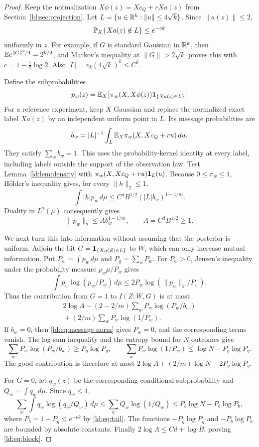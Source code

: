 \begin{proof}
Keep the normalization $X\phi(z)=Xc_Q+rXa(z)$ from
Section~\ref{ld:sec:projection}. Let
$L=\{u\in\mathbb R^k:\|u\|\le4\sqrt k\}$. Since $\|a(z)\|\le2$,
\begin{equation}\label{ld:eq:tail}
 \mathbb P_X\{Xa(z)\notin L\}\le e^{-ck}
\end{equation}
uniformly in $z$. For example, if $G$ is standard Gaussian in
$\mathbb R^k$, then $\mathbb E e^{\|G\|^2/4}=2^{k/2}$, and Markov's inequality
at $\|G\|>2\sqrt k$ proves this with $c=1-\tfrac12\log2$.
Also $|L|=v_k(4\sqrt k)^k\le C^k$.

Define the subprobabilities
\[
 p_w(z)=\mathbb E_X\bigl[\pi_w(X,X\phi(z))\mathbf 1_{\{Xa(z)\in L\}}\bigr]
\]
For a reference experiment, keep $X$ Gaussian and replace the normalized
exact label $Xa(z)$ by an independent uniform point in $L$. Its message
probabilities are
\[
 b_w=|L|^{-1}\int_L\mathbb E_X\pi_w(X,Xc_Q+ru)\,du.
\]
They satisfy $\sum_wb_w=1$. This uses the probability-kernel identity
at every label, including labels outside the support of the observation
law. Test Lemma~\ref{ld:lem:density} with
$\pi_w(X,Xc_Q+ru)\mathbf 1_L(u)$. Because $0\le\pi_w\le1$,
H\"older's inequality gives, for every $\|h\|_2\le1$,
\[
 \int|h|p_w\,d\mu
 \le C^dB^{1/2}(|L|b_w)^{1-1/m}.
\]
Duality in $L^2(\mu)$ consequently gives
\begin{equation}\label{ld:eq:message-norm}
 \|p_w\|_2\le A b_w^{1-1/m},\qquad A=C^dB^{1/2}\ge1.
\end{equation}

We next turn this into information without assuming that the posterior
is uniform. Adjoin the bit $G=\mathbf 1_{\{Xa(Z)\in L\}}$ to $W$,
which can only increase mutual information. Put
$P_w=\int p_w\,d\mu$ and $P_g=\sum_wP_w$.
For $P_w>0$, Jensen's inequality under the probability measure
$p_w\mu/P_w$ gives
\[
 \int p_w\log(p_w/P_w)\,d\mu
 \le2P_w\log(\|p_w\|_2/P_w).
\]
Thus the contribution from $G=1$ to $I(Z;W,G)$ is at most
\begin{multline*}
 2\log A-(2-2/m)\sum_wP_w\log(P_w/b_w)\\
 {}+(2/m)\sum_wP_w\log(1/P_w).
\end{multline*}
If $b_w=0$, then \eqref{ld:eq:message-norm} gives $P_w=0$, and the
corresponding terms vanish. The log-sum inequality and the entropy
bound for $N$ outcomes give
\[
 \sum_wP_w\log(P_w/b_w)\ge P_g\log P_g,
 \qquad
 \sum_wP_w\log(1/P_w)\le\log N-P_g\log P_g.
\]
The good contribution is therefore at most
$2\log A+(2/m)\log N-2P_g\log P_g$.

For $G=0$, let $q_w(z)$ be the corresponding conditional
subprobability and $Q_w=\int q_w\,d\mu$. Since $q_w\le1$,
\[
 \sum_w\int q_w\log(q_w/Q_w)\,d\mu
 \le\sum_wQ_w\log(1/Q_w)
 \le P_b\log N-P_b\log P_b,
\]
where $P_b=1-P_g\le e^{-ck}$ by \eqref{ld:eq:tail}.
The functions $-P_g\log P_g$ and $-P_b\log P_b$ are bounded by
absolute constants. Finally $2\log A\le Cd+\log B$, proving
\eqref{ld:eq:block}.
\end{proof}

